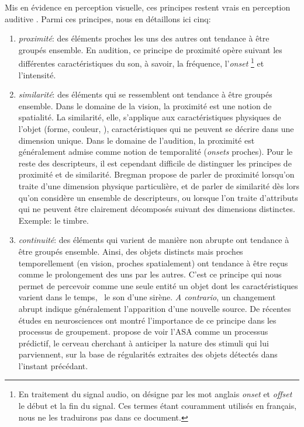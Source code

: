 Mis en évidence en perception visuelle, ces principes restent vrais en perception auditive \citep[ch. 1]{bregman1994auditory}. Parmi ces principes, nous en détaillons ici cinq:

\begin{enumerate}
\item \emph{proximité}: des éléments proches les uns des autres ont tendance à être groupés ensemble. En audition, ce principe de proximité opère suivant les différentes caractéristiques du son, à savoir, la fréquence, l'\emph{onset} \footnote{En traitement du signal audio, on désigne par les mot anglais \emph{onset} et \emph{offset} le début et la fin du signal. Ces termes étant couramment utilisés en français, nous ne les traduirons pas dans ce document.} et l'intensité.
 
\item \emph{similarité}: des éléments qui se ressemblent ont tendance à être groupés ensemble. 
Dans le domaine de la vision, la proximité est une notion de spatialité. La similarité, elle, s'applique aux caractéristiques physiques de l'objet (forme, couleur, \etc), caractéristiques qui ne peuvent se décrire dans une dimension unique. 
Dans le domaine de l'audition, la proximité est généralement admise comme notion de temporalité (\emph{onsets} proches). Pour le reste des descripteurs, il est cependant difficile de distinguer les principes de proximité et de similarité. Bregman propose de parler de proximité lorsqu'on traite d'une dimension physique particulière, et de parler de similarité dès lors qu'on considère un ensemble de descripteurs, ou lorsque l'on traite d'attributs qui ne peuvent être clairement décomposés suivant des dimensions distinctes. Exemple: le timbre.
\item \emph{continuité}: des éléments qui varient de manière non abrupte ont tendance à être groupés ensemble. Ainsi, des objets distincts mais proches temporellement (en vision, proches spatialement) ont tendance à être reçus comme le prolongement des uns par les autres. C'est ce principe qui nous permet de percevoir comme une seule entité un objet dont les caractéristiques varient dans le temps, \eg~le son d'une sirène. \emph{A contrario}, un changement abrupt indique généralement l'apparition d'une nouvelle source.
De récentes études en neurosciences ont montré l'importance de ce principe dans les processus de groupement. \citep{winkler2009modeling}  propose de voir l'ASA comme un processus prédictif, le cerveau cherchant à anticiper la nature des stimuli qui lui parviennent, sur la base de régularités extraites des objets détectés dans l'instant précédant.

\end{enumerate}
